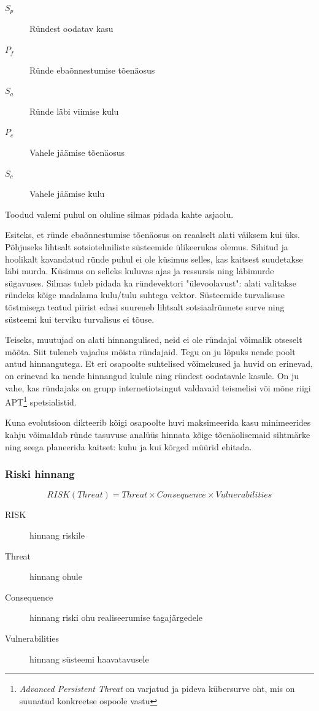 \documentclass{article}
\begin{document}
	\begin{description}
		\item[$S_p$] Ründest oodatav kasu
		\item[$P_f$] Ründe ebaõnnestumise tõenäosus
		\item[$S_a$] Ründe läbi viimise kulu
		\item[$P_c$] Vahele jäämise tõenäosus
		\item[$S_c$] Vahele jäämise kulu
	\end{description}

Toodud valemi puhul on oluline silmas pidada kahte asjaolu. 

Esiteks, et ründe ebaõnnestumise tõenäosus on reaalselt alati väiksem kui üks. Põhjuseks lihtsalt sotsiotehniliste süsteemide ülikeerukas olemus. Sihitud ja hoolikalt kavandatud ründe puhul ei ole küsimus selles, kas kaitsest suudetakse läbi murda. Küsimus on selleks kuluvas ajas ja ressursis ning läbimurde sügavuses. Silmas tuleb pidada ka ründevektori "ülevoolavust": alati valitakse ründeks kõige madalama kulu/tulu suhtega vektor. Süsteemide turvalisuse tõstmisega teatud piirist edasi suureneb lihtsalt sotsiaalrünnete surve ning süsteemi kui terviku turvalisus ei tõuse. 

Teiseks, muutujad on alati hinnangulised, neid ei ole ründajal võimalik otseselt mõõta. Siit tuleneb vajadus mõista ründajaid. Tegu on ju lõpuks nende poolt antud hinnangutega. Et eri osapoolte suhtelised võimekused ja huvid on erinevad, on erinevad ka nende hinnangud kulule ning ründest oodatavale kasule. On ju vahe, kas ründajaks on grupp internetiotsingut valdavaid teismelisi või mõne riigi APT\footnote{\emph{Advanced Persistent Threat} on varjatud ja pideva kübersurve oht, mis on suunatud konkreetse ospoole vastu} spetsialistid. 

Kuna evolutsioon dikteerib kõigi osapoolte huvi maksimeerida kasu minimeerides kahju võimaldab ründe tasuvuse analüüs hinnata kõige tõenäolisemaid sihtmärke ning seega planeerida kaitset: kuhu ja kui kõrged müürid ehitada. 

\subsubsection{Riski hinnang}

\begin{equation}
	RISK(Threat) = Threat \times Consequence \times Vulnerabilities
	\label{eq:risk}
\end{equation}

\begin{description}
	\item[RISK] hinnang riskile
	\item[Threat] hinnang ohule
	\item[Consequence] hinnang riski ohu realiseerumise tagajärgedele
	\item[Vulnerabilities] hinnang süsteemi haavatavusele
\end{description}
\end{document}
